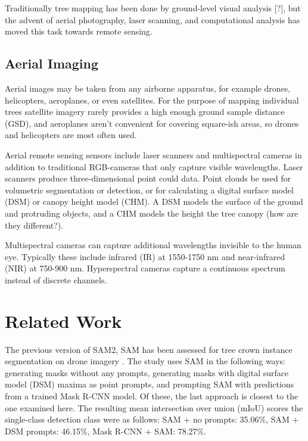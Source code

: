 \documentclass[english, 12pt, a4paper, sci, utf8, a-2b, online]{aaltothesis}
\begin{document}
Traditionally tree mapping has been done by ground-level visual analysis [?], but the advent of aerial photography, laser scanning, and computational analysis has moved this task towards remote sensing.

\subsection{Aerial Imaging}

Aerial images may be taken from any airborne apparatus, for example drones, helicopters, aeroplanes, or even satellites. For the purpose of mapping individual trees satellite imagery rarely provides a high enough ground sample distance (GSD), and aeroplanes aren't convenient for covering square-ish areas, so drones and helicopters are most often used.
\newline
{}
\newline

Aerial remote sensing sensors include laser scanners and multispectral cameras in addition to traditional RGB-cameras that only capture visible wavelengths. Laser scanners produce three-dimensional point could data. Point clouds be used for volumetric segmentation or detection, or for calculating a digital surface model (DSM) or canopy height model (CHM). A DSM models the surface of the ground and protruding objects, and a CHM models the height the tree canopy (how are they different?).
\newline
{}
\newline

Multispectral cameras can capture additional wavelengths invisible to the human eye. Typically these include infrared (IR) at 1550-1750 nm and near-infrared (NIR) at 750-900 nm. Hyperspectral cameras capture a continuous spectrum instead of discrete channels.
\newline
{}
\newline

\newpage
\section{Related Work}

The previous version of SAM2, SAM has been assessed for tree crown instance segmentation on drone imagery \cite{sam-treecrown}. The study uses SAM in the following ways: generating masks without any prompts, generating masks with digital surface model (DSM) maxima as point prompts, and prompting SAM with predictions from a trained Mask R-CNN model. Of these, the last approach is closest to the one examined here. The resulting mean intersection over union (mIoU) scores the single-class detection class were as follows: SAM + no prompts: 35.06\%, SAM + DSM prompts: 46.15\%, Mask R-CNN + SAM: 78.27\%.
\end{document}
